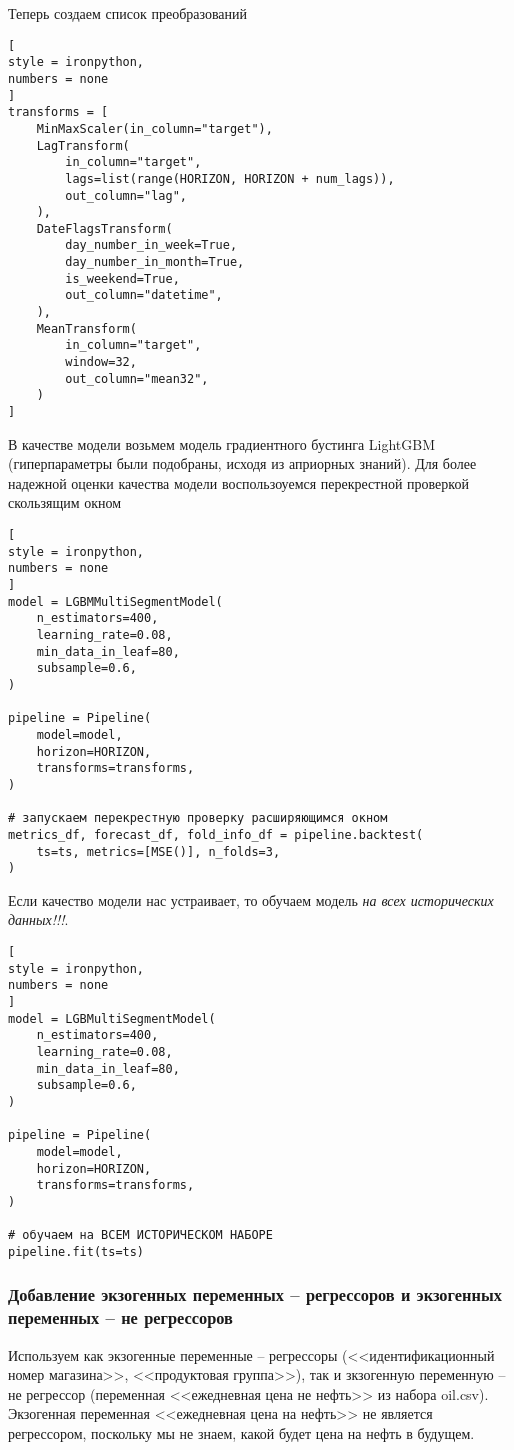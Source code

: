\documentclass[%
	11pt,
	a4paper,
	utf8,
		]{article}
\begin{document}
Теперь создаем список преобразований
\begin{lstlisting}[
style = ironpython,
numbers = none
]
transforms = [
    MinMaxScaler(in_column="target"),
    LagTransform(
        in_column="target",
        lags=list(range(HORIZON, HORIZON + num_lags)),
        out_column="lag",
    ),
    DateFlagsTransform(
        day_number_in_week=True,
        day_number_in_month=True,
        is_weekend=True,
        out_column="datetime",
    ),
    MeanTransform(
        in_column="target",
        window=32,
        out_column="mean32",
    )
]
\end{lstlisting}

В качестве модели возьмем модель градиентного бустинга LightGBM (гиперпараметры были подобраны, исходя из априорных знаний). Для более надежной оценки качества модели воспользоуемся перекрестной проверкой скользящим окном
\begin{lstlisting}[
style = ironpython,
numbers = none	
]
model = LGBMMultiSegmentModel(
    n_estimators=400,
    learning_rate=0.08,
    min_data_in_leaf=80,
    subsample=0.6,
)

pipeline = Pipeline(
    model=model,
    horizon=HORIZON,
    transforms=transforms,
)

# запускаем перекрестную проверку расширяющимся окном
metrics_df, forecast_df, fold_info_df = pipeline.backtest(
    ts=ts, metrics=[MSE()], n_folds=3,
)
\end{lstlisting}

Если качество модели нас устраивает, то обучаем модель \emph{\color{blue}на всех исторических данных!!!}.
\begin{lstlisting}[
style = ironpython,
numbers = none
]
model = LGBMultiSegmentModel(
    n_estimators=400,
    learning_rate=0.08,
    min_data_in_leaf=80,
    subsample=0.6,
)

pipeline = Pipeline(
    model=model,
    horizon=HORIZON,
    transforms=transforms,
)

# обучаем на ВСЕМ ИСТОРИЧЕСКОМ НАБОРЕ
pipeline.fit(ts=ts)
\end{lstlisting}

\subsubsection{Добавление экзогенных переменных -- регрессоров и экзогенных переменных -- не регрессоров}

Используем как экзогенные переменные -- регрессоры (<<идентификационный номер магазина>>, <<продуктовая группа>>), так и зкзогенную переменную -- не регрессор (переменная <<ежедневная цена не нефть>> из набора oil.csv). Экзогенная переменная <<ежедневная цена на нефть>> не является регрессором, поскольку мы не знаем, какой будет цена на нефть в будущем.
\end{document}
